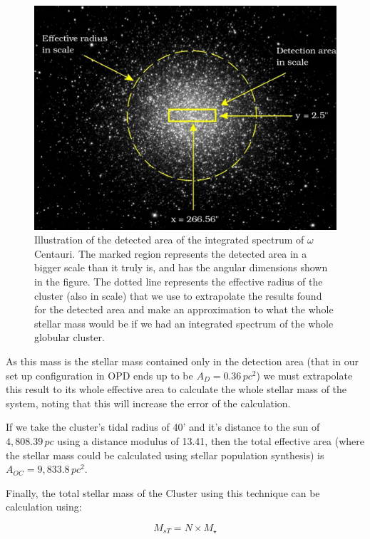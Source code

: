 \begin{figure}[H]
\centering
\includegraphics[width=12cm]{images/OmegaCentauriii.jpg}
\caption[Illustration of the detected area of the integrated spectrum]{Illustration of the detected area of the integrated spectrum of $\omega$ Centauri. The marked region represents the detected area in a bigger scale than it truly is, and has the angular dimensions shown in the figure. The dotted line represents the effective radius of the cluster (also in scale) that we use to extrapolate the results found for the detected area and make an approximation to what the whole stellar mass would be if we had an integrated spectrum of the whole globular cluster.}
\end{figure}

As this mass is the stellar mass contained only in the detection area (that in our set up configuration in OPD ends up to be $A_{D}=0.36\,pc^{2}$) we must extrapolate this result to its whole effective area to calculate the whole stellar mass of the system, noting that this will increase the error of the calculation.

If we take the cluster's tidal radius of 40' and it's distance to the sun of $4,808.39\,pc$ using a distance modulus of 13.41, then the total effective area (where the stellar mass could be calculated using stellar population synthesis) is $A_{OC}=9,833.8\,pc^{2}$. 

Finally, the total stellar mass of the Cluster using this technique can be calculation using:

\begin{equation}
M_{s T} = N \times M_{\star}
\end{equation}

